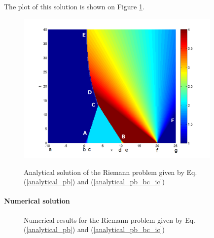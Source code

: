 \documentclass[letterpaper,10pt]{article}
\begin{document}
The plot of this solution is shown on Figure \ref{analytical_solution_plot}.

\begin{figure}
\centering
\includegraphics[width=10cm]{../Simulation_Results/Verify_CTM_results/Analytical.png}\\
    \caption{Analytical solution of the Riemann problem given by Eq.(\ref{analytical_pb}) and (\ref{analytical_pb_bc_ic})}
    \label{analytical_solution_plot}
\end{figure}

\paragraph{Numerical solution}

\begin{figure}
  \centering
  \caption{Numerical results for the Riemann problem given by Eq.(\ref{analytical_pb}) and (\ref{analytical_pb_bc_ic})}
  \label{Numerical_Sol}
\end{figure}
\end{document}
